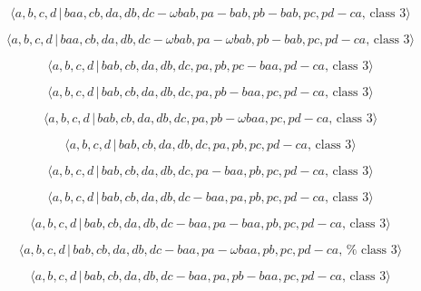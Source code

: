 \documentclass[10pt]{article}
\begin{document}
\begin{equation}
\langle a,b,c,d\,|\,baa,cb,da,db,dc-\omega bab,pa-bab,pb-bab,pc,pd-ca,\,%
\text{class }3\rangle  \tag{7.4044}
\end{equation}

\begin{equation}
\langle a,b,c,d\,|\,baa,cb,da,db,dc-\omega bab,pa-\omega
bab,pb-bab,pc,pd-ca,\,\text{class }3\rangle  \tag{7.4045}
\end{equation}

\begin{equation}
\langle a,b,c,d\,|\,bab,cb,da,db,dc,pa,pb,pc-baa,pd-ca,\,\text{class }%
3\rangle  \tag{7.4046}
\end{equation}

\begin{equation}
\langle a,b,c,d\,|\,bab,cb,da,db,dc,pa,pb-baa,pc,pd-ca,\,\text{class }%
3\rangle  \tag{7.4047}
\end{equation}

\begin{equation}
\langle a,b,c,d\,|\,bab,cb,da,db,dc,pa,pb-\omega baa,pc,pd-ca,\,\text{class }%
3\rangle  \tag{7.4048}
\end{equation}

\begin{equation}
\langle a,b,c,d\,|\,bab,cb,da,db,dc,pa,pb,pc,pd-ca,\,\text{class }3\rangle 
\tag{7.4049}
\end{equation}

\begin{equation}
\langle a,b,c,d\,|\,bab,cb,da,db,dc,pa-baa,pb,pc,pd-ca,\,\text{class }%
3\rangle  \tag{7.4050}
\end{equation}

\begin{equation}
\langle a,b,c,d\,|\,bab,cb,da,db,dc-baa,pa,pb,pc,pd-ca,\,\text{class }%
3\rangle  \tag{7.4051}
\end{equation}

\begin{equation}
\langle a,b,c,d\,|\,bab,cb,da,db,dc-baa,pa-baa,pb,pc,pd-ca,\,\text{class }%
3\rangle  \tag{7.4052}
\end{equation}

\begin{equation}
\langle a,b,c,d\,|\,bab,cb,da,db,dc-baa,pa-\omega baa,pb,pc,pd-ca,\,\text{%
class }3\rangle  \tag{7.4053}
\end{equation}

\begin{equation}
\langle a,b,c,d\,|\,bab,cb,da,db,dc-baa,pa,pb-baa,pc,pd-ca,\,\text{class }%
3\rangle  \tag{7.4054}
\end{equation}
\end{document}
